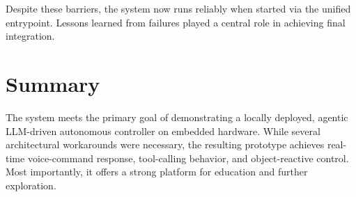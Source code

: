 Despite these barriers, the system now runs reliably when started via the unified entrypoint. Lessons learned from failures played a central role in achieving final integration.

\section{Summary}

The system meets the primary goal of demonstrating a locally deployed, agentic LLM-driven autonomous controller on embedded hardware. While several architectural workarounds were necessary, the resulting prototype achieves real-time voice-command response, tool-calling behavior, and object-reactive control. Most importantly, it offers a strong platform for education and further exploration.
